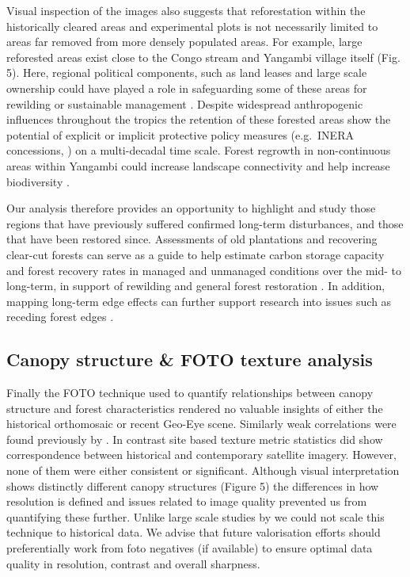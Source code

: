 \documentclass[remote sensing,article,submit,moreauthors,pdftex,10pt,a4paper]{mdpi}
\begin{document}
Visual inspection of the images also suggests that reforestation within
the historically cleared areas and experimental plots is not necessarily
limited to areas far removed from more densely populated areas. For
example, large reforested areas exist close to the Congo stream and
Yangambi village itself (Fig. 5). Here, regional political components,
such as land leases and large scale ownership could have played a role
in safeguarding some of these areas for rewilding or sustainable
management \citep{arima2014, larson2011}. Despite widespread
anthropogenic influences throughout the tropics \citep{lewis2015} the
retention of these forested areas show the potential of explicit or
implicit protective policy measures (e.g.~INERA concessions,
\citet{bustillo2018}) on a multi-decadal time scale. Forest regrowth in
non-continuous areas within Yangambi could increase landscape
connectivity and help increase biodiversity \citep{vandeperre2018}.

Our analysis therefore provides an opportunity to highlight and study
those regions that have previously suffered confirmed long-term
disturbances, and those that have been restored since. Assessments of
old plantations and recovering clear-cut forests can serve as a guide to
help estimate carbon storage capacity and forest recovery rates in
managed and unmanaged conditions
\citep{gourlet-fleury2013, sader1988, achard2014} over the mid- to
long-term, in support of rewilding and general forest restoration
\citep{arima2014, larson2011, vandeperre2018}. In addition, mapping
long-term edge effects can further support research into issues such as
receding forest edges \citep{gascon2000}.

\hypertarget{canopy-structure-foto-texture-analysis-2}{%
\subsection{Canopy structure \& FOTO texture
analysis}\label{canopy-structure-foto-texture-analysis-2}}

Finally the FOTO technique used to quantify relationships between canopy
structure and forest characteristics rendered no valuable insights of
either the historical orthomosaic or recent Geo-Eye scene. Similarly
weak correlations were found previously by \citet{solorzano2018}. In
contrast site based texture metric statistics did show correspondence
between historical and contemporary satellite imagery. However, none of
them were either consistent or significant. Although visual
interpretation shows distinctly different canopy structures (Figure 5)
the differences in how resolution is defined and issues related to image
quality prevented us from quantifying these further. Unlike large scale
studies by \citet{Ploton2012} we could not scale this technique to
historical data. We advise that future valorisation efforts should
preferentially work from foto negatives (if available) to ensure optimal
data quality in resolution, contrast and overall sharpness.
\end{document}
